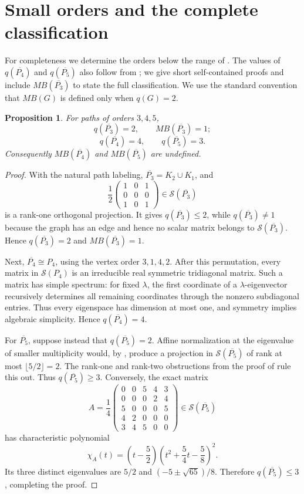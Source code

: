 \documentclass[11pt]{article}
\newtheorem{proposition}[theorem]{Proposition}
\theoremstyle{remark}
\newcommand{\cS}{\mathcal{S}}
\begin{document}
\section{Small orders and the complete classification}

For completeness we determine the orders below the range of
.  The values of $q(\overline{P_4})$ and
$q(\overline{P_5})$ also follow from
\cite[Theorem~3.2]{LeveneOblakSmigoc2019}; we give short self-contained
proofs and include $MB(\overline{P_3})$ to state the full classification.
We use the standard convention that $MB(G)$ is defined only when $q(G)=2$.

\begin{proposition}\label{prop:small}
For paths of orders $3,4,5$,
\[
 q(\overline{P_3})=2,\qquad MB(\overline{P_3})=1;
\]
\[
 q(\overline{P_4})=4,\qquad q(\overline{P_5})=3.
\]
Consequently $MB(\overline{P_4})$ and $MB(\overline{P_5})$ are undefined.
\end{proposition}

\begin{proof}
With the natural path labeling, $\overline{P_3}=K_2\cup K_1$, and
\[
 \frac12
 \begin{pmatrix}
 1&0&1\\0&0&0\\1&0&1
 \end{pmatrix}
 \in\cS(\overline{P_3})
\]
is a rank-one orthogonal projection.  It gives
$q(\overline{P_3})\le2$, while
$q(\overline{P_3})\ne1$ because the graph has an edge and hence no scalar
matrix belongs to $\cS(\overline{P_3})$.  Hence
$q(\overline{P_3})=2$ and $MB(\overline{P_3})=1$.

Next, $\overline{P_4}\cong P_4$, using the vertex order $3,1,4,2$.
After this permutation, every matrix in $\cS(P_4)$ is an irreducible real
symmetric tridiagonal matrix.  Such a matrix has simple spectrum: for fixed
$\lambda$, the first coordinate of a $\lambda$-eigenvector recursively
determines all remaining coordinates through the nonzero subdiagonal
entries.  Thus every eigenspace has dimension at most one, and symmetry
implies algebraic simplicity.  Hence $q(\overline{P_4})=4$.

For $\overline{P_5}$, suppose instead that $q(\overline{P_5})=2$.
Affine normalization at the eigenvalue of smaller multiplicity would, by
, produce a projection in
$\cS(\overline{P_5})$ of rank at most $\lfloor5/2\rfloor=2$.  The rank-one
and rank-two obstructions from the proof of  rule this out.
Thus $q(\overline{P_5})\ge3$.  Conversely, the exact matrix
\[
 A=\frac14
 \begin{pmatrix}
 0&0&5&4&3\\
 0&0&0&2&4\\
 5&0&0&0&5\\
 4&2&0&0&0\\
 3&4&5&0&0
 \end{pmatrix}
 \in\cS(\overline{P_5})
\tag{5.1}\label{eq:p5matrix}
\]
has characteristic polynomial
\[
 \chi_A(t)=\left(t-\frac52\right)
            \left(t^2+\frac54t-\frac58\right)^2.
\]
Its three distinct eigenvalues are
$5/2$ and $(-5\pm\sqrt{65})/8$.  Therefore
$q(\overline{P_5})\le3$, completing the proof.
\end{proof}
\end{document}
